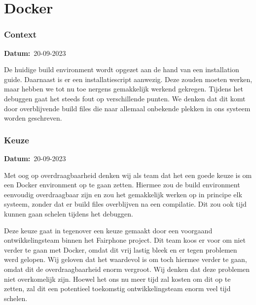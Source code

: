 \documentclass[a4paper]{report}
\newcommand{\teambox}{
  \begin{tcolorbox}[hbox, colback=blue!5!white,colframe=blue!75!black,
    left=.1mm, right=.1mm, top=.1mm, bottom=.1mm, fontupper=\scriptsize\sffamily]
    Team Keuze
  \end{tcolorbox}
}
\newcommand{\teamchoice}[1]{
  \section[ #1 ]{#1~\mbox{\raisebox{-2.5pt}{\teambox}}}
}
\newcommand{\timestamp}[1]{
  \mbox{\scriptsize \textbf{Datum:} #1} \smallbreak
}
\begin{document}



\teamchoice{Docker}
\subsubsection{Context}
\timestamp{20-09-2023}
De huidige build environment wordt opgezet aan de hand van een installation guide.
Daarnaast is er een installatiescript aanwezig.
Deze zouden moeten werken, maar hebben we tot nu toe nergens gemakkelijk werkend gekregen.
Tijdens het debuggen gaat het steeds fout op verschillende punten. We denken dat dit komt door overblijvende build files die naar allemaal onbekende plekken in ons systeem worden geschreven.

\subsubsection{Keuze}
\timestamp{20-09-2023}
Met oog op overdraagbaarheid denken wij als team dat het een goede keuze is om een Docker environment op te gaan zetten. 
Hiermee zou de build environment eenvoudig overdraagbaar zijn en zou het gemakkelijk werken op in principe elk systeem, zonder dat er build files overblijven na een compilatie.
Dit zou ook tijd kunnen gaan schelen tijdens het debuggen. 
\par\smallskip
Deze keuze gaat in tegenover een keuze gemaakt door een voorgaand ontwikkelingsteam binnen het Fairphone project. 
Dit team koos er voor om niet verder te gaan met Docker, omdat dit vrij lastig bleek en er tegen problemen werd gelopen.
Wij geloven dat het waardevol is om toch hiermee verder te gaan, omdat dit de overdraagbaarheid enorm vergroot. Wij denken dat deze problemen niet overkomelijk zijn.
Hoewel het ons nu meer tijd zal kosten om dit op te zetten, zal dit een potentieel toekomstig ontwikkelingsteam enorm veel tijd schelen.
\end{document}
